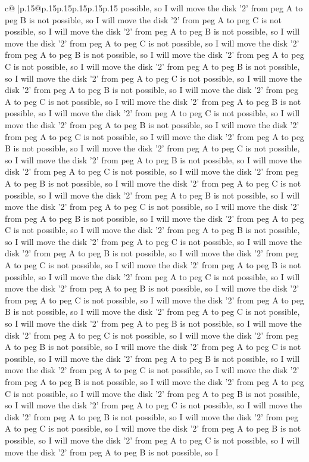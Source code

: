 \documentclass{article}
\begin{document}
{\begin{supertabular}{c@{$\;$}|p{.15\linewidth}@{}p{.15\linewidth}p{.15\linewidth}p{.15\linewidth}p{.15\linewidth}p{.15\linewidth}}
{{{possible, so I will move the disk '2' from peg A to peg B is not possible, so I will move the disk '2' from peg A to peg C is not possible, so I will move the disk '2' from peg A to peg B is not possible, so I will move the disk '2' from peg A to peg C is not possible, so I will move the disk '2' from peg A to peg B is not possible, so I will move the disk '2' from peg A to peg C is not possible, so I will move the disk '2' from peg A to peg B is not possible, so I will move the disk '2' from peg A to peg C is not possible, so I will move the disk '2' from peg A to peg B is not possible, so I will move the disk '2' from peg A to peg C is not possible, so I will move the disk '2' from peg A to peg B is not possible, so I will move the disk '2' from peg A to peg C is not possible, so I will move the disk '2' from peg A to peg B is not possible, so I will move the disk '2' from peg A to peg C is not possible, so I will move the disk '2' from peg A to peg B is not possible, so I will move the disk '2' from peg A to peg C is not possible, so I will move the disk '2' from peg A to peg B is not possible, so I will move the disk '2' from peg A to peg C is not possible, so I will move the disk '2' from peg A to peg B is not possible, so I will move the disk '2' from peg A to peg C is not possible, so I will move the disk '2' from peg A to peg B is not possible, so I will move the disk '2' from peg A to peg C is not possible, so I will move the disk '2' from peg A to peg B is not possible, so I will move the disk '2' from peg A to peg C is not possible, so I will move the disk '2' from peg A to peg B is not possible, so I will move the disk '2' from peg A to peg C is not possible, so I will move the disk '2' from peg A to peg B is not possible, so I will move the disk '2' from peg A to peg C is not possible, so I will move the disk '2' from peg A to peg B is not possible, so I will move the disk '2' from peg A to peg C is not possible, so I will move the disk '2' from peg A to peg B is not possible, so I will move the disk '2' from peg A to peg C is not possible, so I will move the disk '2' from peg A to peg B is not possible, so I will move the disk '2' from peg A to peg C is not possible, so I will move the disk '2' from peg A to peg B is not possible, so I will move the disk '2' from peg A to peg C is not possible, so I will move the disk '2' from peg A to peg B is not possible, so I will move the disk '2' from peg A to peg C is not possible, so I will move the disk '2' from peg A to peg B is not possible, so I will move the disk '2' from peg A to peg C is not possible, so I will move the disk '2' from peg A to peg B is not possible, so I will move the disk '2' from peg A to peg C is not possible, so I will move the disk '2' from peg A to peg B is not possible, so I will move the disk '2' from peg A to peg C is not possible, so I will move the disk '2' from peg A to peg B is not possible, so I will move the disk '2' from peg A to peg C is not possible, so I will move the disk '2' from peg A to peg B is not possible, so I will move the disk '2' from peg A to peg C is not possible, so I will move the disk '2' from peg A to peg B is not possible, so I }}}
\end{supertabular}}
\end{document}
